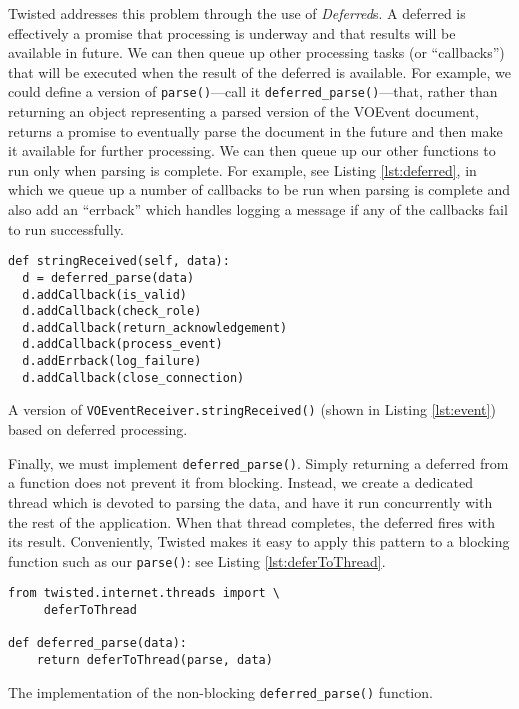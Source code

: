 \documentclass[5p,authoryear]{elsarticle}
\begin{document}
Twisted addresses this problem through the use of \textit{Deferred}s. A
deferred is effectively a promise that processing is underway and that results
will be available in future. We can then queue up other processing tasks (or
``callbacks'') that will be executed when the result of the deferred is
available. For example, we could define a version of
\texttt{parse()}---call it
\texttt{deferred\_parse()}---that, rather than returning an object
representing a parsed version of the VOEvent document, returns a promise to
eventually parse the document in the future and then make it available for
further processing. We can then queue up our other functions to run only when
parsing is complete. For example, see Listing \ref{lst:deferred}, in which we
queue up a number of callbacks to be run when parsing is complete and also add
an ``errback'' which handles logging a message if any of the callbacks fail to
run successfully.

\begin{listing}[H]
\begin{verbatim}
def stringReceived(self, data):
  d = deferred_parse(data)
  d.addCallback(is_valid)
  d.addCallback(check_role)
  d.addCallback(return_acknowledgement)
  d.addCallback(process_event)
  d.addErrback(log_failure)
  d.addCallback(close_connection)
\end{verbatim}
\caption{A version of \texttt{VOEventReceiver.stringReceived()} (shown in
Listing \ref{lst:event}) based on deferred processing.}
\label{lst:deferred}
\end{listing}

Finally, we must implement \texttt{deferred\_parse()}.  Simply returning a
deferred from a function does not prevent it from blocking.  Instead, we
create a dedicated thread which is devoted to parsing the data, and have it
run concurrently with the rest of the application. When that thread completes,
the deferred fires with its result. Conveniently, Twisted makes it easy to
apply this pattern to a blocking function such as our \texttt{parse()}: see
Listing \ref{lst:deferToThread}.

\begin{listing}[H]
\begin{verbatim}
from twisted.internet.threads import \
     deferToThread

def deferred_parse(data):
    return deferToThread(parse, data)
\end{verbatim}
\caption{The implementation of the non-blocking \texttt{deferred\_parse()} function.}
\label{lst:deferToThread}
\end{listing}
\end{document}
